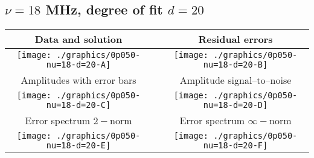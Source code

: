 

% 

\clearpage{}
\break{}

\subsection{$\nu = 18$ MHz, degree of fit $d = 20$}

\begin{table}[h]
    \begin{center}
        \begin{tabular}{ccc}
            Data and solution & \quad & Residual errors \\\hline
            \texttt{[image: ./graphics/0p050-nu=18-d=20-A]} &&
            \texttt{[image: ./graphics/0p050-nu=18-d=20-B]} \\[15pt]
            Amplitudes with error bars && Amplitude signal--to--noise \\\hline
            \texttt{[image: ./graphics/0p050-nu=18-d=20-C]} &&
            \texttt{[image: ./graphics/0p050-nu=18-d=20-D]} \\[15pt]
            Error spectrum $2-$norm && Error spectrum $\infty-$norm \\\hline
            \texttt{[image: ./graphics/0p050-nu=18-d=20-E]} &&
            \texttt{[image: ./graphics/0p050-nu=18-d=20-F]} \\[15pt]
        \end{tabular}
    \end{center}
\label{fig:elev=50, nu=18}
\end{table}



\endinput
